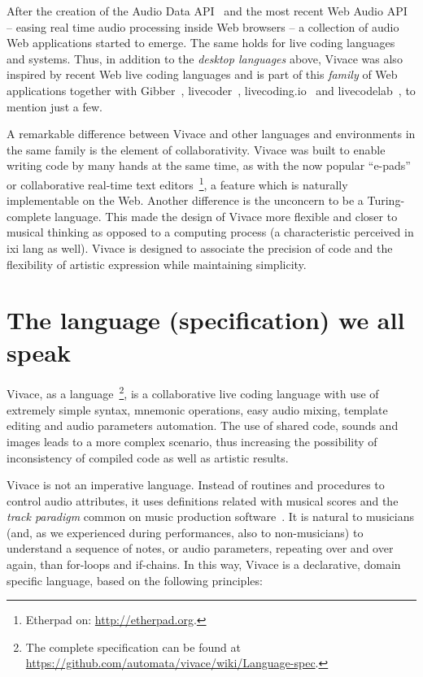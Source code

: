 \documentclass[12pt,times,twocolumn]{article}
\begin{document}
After the creation of the Audio Data API~\cite{audiodata} and the most
recent Web Audio API~\cite{webaudio} -- easing real time audio
processing inside Web browsers -- a collection of audio Web
applications started to emerge. The same holds for live coding
languages and systems.  Thus, in addition to the \textit{desktop
  languages} above, Vivace was also inspired by recent Web
live coding languages and is part of this \textit{family} of Web
applications together with Gibber~\cite{gibber},
livecoder~\cite{livecoder}, livecoding.io~\cite{livecodingio} and
livecodelab~\cite{livecodelab}, to mention just a few.

A remarkable difference between Vivace and other languages and
environments in the same family is the element of
collaborativity. Vivace was built to enable writing code by many
hands at the same time, as with the now popular ``e-pads'' or
collaborative real-time text editors~\footnote{Etherpad on:
  \url{http://etherpad.org}.}, a feature which is naturally
implementable on the Web. Another difference is the unconcern to be a
Turing-complete language. This made the design of Vivace more flexible
and closer to musical thinking as opposed to a computing process (a
characteristic perceived in ixi lang as well). Vivace is designed to
associate the precision of code and the flexibility of artistic
expression while maintaining simplicity.

\section{The language (specification) we all speak}

Vivace, as a language~\footnote{The complete specification can be
  found at
  \url{https://github.com/automata/vivace/wiki/Language-spec}.}, is a
collaborative live coding language with use of extremely simple
syntax, mnemonic operations, easy audio mixing, template editing and
audio parameters automation. The use of shared code, sounds and images
leads to a more complex scenario, thus increasing the possibility of
inconsistency of compiled code as well as artistic
results.

Vivace is not an imperative language. Instead of routines and
procedures to control audio attributes, it uses definitions related
with musical scores and the \emph{track paradigm} common on music
production software~\cite{track}. It is natural to musicians (and, as we
experienced during performances, also to non-musicians) to understand
a sequence of notes, or audio parameters, repeating over and over
again, than for-loops and if-chains. In this way, Vivace is a
declarative, domain specific language, based on the following
principles:
\end{document}
